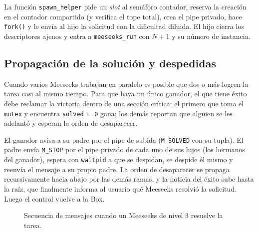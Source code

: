 \documentclass[11pt,letterpaper]{article}
\makeatletter
\newcommand{\codigo}[2]{%
  \edef\lin{\csname line@#1\endcsname}%
  }
\makeatother
\begin{document}
La función \texttt{spawn\_helper} pide un \emph{slot} al semáforo contador, reserva la
creación en el contador compartido (y verifica el tope total), crea el pipe privado, hace
\texttt{fork()} y le envía al hijo la solicitud con la dificultad diluida. El hijo cierra
los descriptores ajenos y entra a \texttt{meeseeks\_run} con $N+1$ y su número de
instancia.

\codigo{spawn}{Creación de un ayudante}

\subsection{Propagación de la solución y despedidas}\label{sec:propag}

Cuando varios Meeseeks trabajan en paralelo es posible que dos o más logren la tarea casi
al mismo tiempo. Para que haya un único ganador, el que tiene éxito debe reclamar la
victoria dentro de una sección crítica: el primero que toma el \texttt{mutex} y encuentra
\texttt{solved = 0} gana; los demás reportan que alguien se les adelantó y esperan la
orden de desaparecer.

\codigo{claim}{Victoria exclusiva}

El ganador avisa a su padre por el pipe de subida (\texttt{M\_SOLVED} con su tupla). El
padre envía \texttt{M\_STOP} por el pipe privado de cada uno de sus hijos (los hermanos del
ganador), espera con \texttt{waitpid} a que se despidan, se despide él mismo y reenvía el
mensaje a su propio padre. La orden de desaparecer se propaga recursivamente hacia abajo
por las demás ramas, y la noticia del éxito sube hasta la raíz, que finalmente informa al
usuario qué Meeseeks resolvió la solicitud. Luego el control vuelve a la Box.

\codigo{stopall}{Detener a todos los hijos y esperarlos}

\begin{figure}[H]
\centering
{}
\caption{Secuencia de mensajes cuando un Meeseeks de nivel 3 resuelve la tarea.}
\label{fig:secuencia}
\end{figure}
\end{document}
